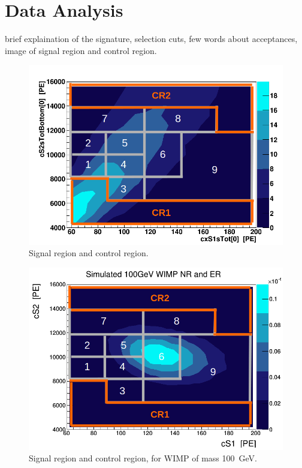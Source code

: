 \section{Data Analysis}

brief explaination of the signature, selection cuts, few words about acceptances, image of signal region and control region.

\begin{figure}[h]
  \includegraphics[width=\linewidth]{images/bkg_in_sr.png}
  \caption{Signal region and control region.}
  \label{fig:SR}
\end{figure}

\begin{figure}[h]
  \includegraphics[width=\linewidth]{images/wimp_in_sr.png}
  \caption{Signal region and control region, for WIMP of mass 100~GeV.}
  \label{fig:SR2}
\end{figure}


